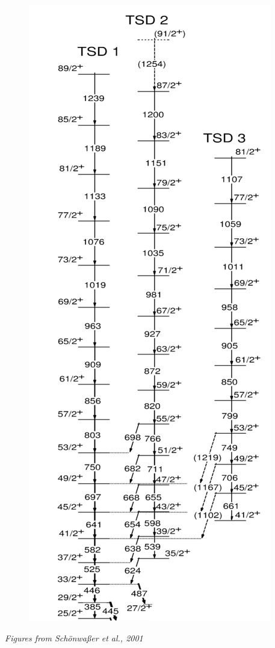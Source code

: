 \documentclass{beamer}
\begin{document}
\begin{frame}
\begin{figure}
    \includegraphics[scale=0.13]{Figs/collective-levels.pdf}
  \end{figure}
  \tiny{\textit{Figures from Schönwaßer et al., 2001}}
\end{frame}
\end{document}
